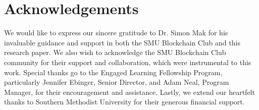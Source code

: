 \section*{Acknowledgements} 

We would like to express our sincere gratitude to Dr. Simon Mak for his invaluable guidance and support in both the SMU Blockchain Club and this research paper. We also wish to acknowledge the SMU Blockchain Club community for their support and collaboration, which were instrumental to this work. Special thanks go to the Engaged Learning Fellowship Program, particularly Jennifer Ebinger, Senior Director, and Adam Neal, Program Manager, for their encouragement and assistance. Lastly, we extend our heartfelt thanks to Southern Methodist University for their generous financial support.